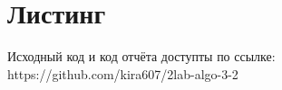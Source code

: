 \section{Листинг}

Исходный код и код отчёта доступты по ссылке: 
https://github.com/kira607/2lab-algo-3-2